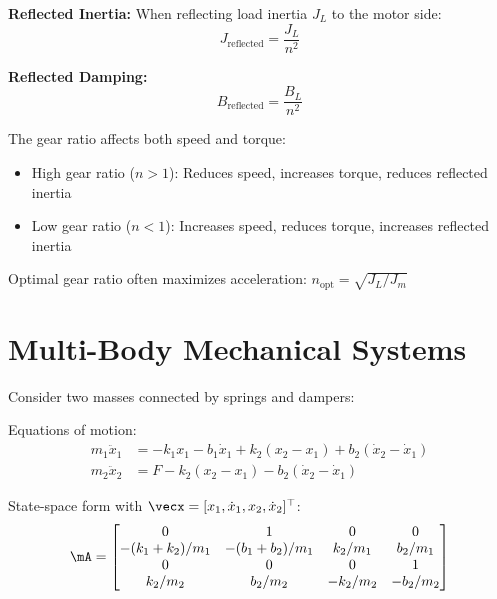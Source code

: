 \textbf{Reflected Inertia:}
When reflecting load inertia $J_L$ to the motor side:
\begin{equation}
J_{\text{reflected}} = \frac{J_L}{n^2}
\end{equation}

\textbf{Reflected Damping:}
\begin{equation}
B_{\text{reflected}} = \frac{B_L}{n^2}
\end{equation}

\begin{keyconceptbox}[title=Gear Ratio Selection]
The gear ratio affects both speed and torque:
\begin{itemize}
    \item High gear ratio ($n > 1$): Reduces speed, increases torque, reduces reflected inertia
    \item Low gear ratio ($n < 1$): Increases speed, reduces torque, increases reflected inertia
\end{itemize}
Optimal gear ratio often maximizes acceleration: $n_{\text{opt}} = \sqrt{J_L/J_m}$
\end{keyconceptbox}

\section{Multi-Body Mechanical Systems}
\label{sec:multibody}

\begin{examplebox}[title=Example 1.5: Two-Mass System]
Consider two masses connected by springs and dampers:



Equations of motion:
\begin{align}
m_1\ddot{x}_1 &= -k_1 x_1 - b_1\dot{x}_1 + k_2(x_2 - x_1) + b_2(\dot{x}_2 - \dot{x}_1) \\
m_2\ddot{x}_2 &= F - k_2(x_2 - x_1) - b_2(\dot{x}_2 - \dot{x}_1)
\end{align}

State-space form with $\vecx = [x_1, \dot{x}_1, x_2, \dot{x}_2]^\top$:
\begin{equation}
\mA = \begin{bmatrix}
0 & 1 & 0 & 0 \\
-(k_1+k_2)/m_1 & -(b_1+b_2)/m_1 & k_2/m_1 & b_2/m_1 \\
0 & 0 & 0 & 1 \\
k_2/m_2 & b_2/m_2 & -k_2/m_2 & -b_2/m_2
\end{bmatrix}
\end{equation}
\end{examplebox}

